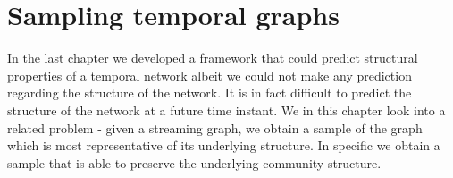 

% 
% 
% 
% 


\chapter{Sampling temporal graphs}

In the last chapter we developed a framework that could predict structural properties of a temporal network albeit we could not make any prediction regarding the 
structure of the network. It is in fact difficult to predict the structure of the network at a future time instant. We in this chapter look into a related problem - 
given a streaming graph, we obtain a sample of the graph which is most representative of its underlying structure. 
In specific we obtain a sample that is able to preserve the underlying community structure. 




%







%






%

\newpage
%
% 
%



